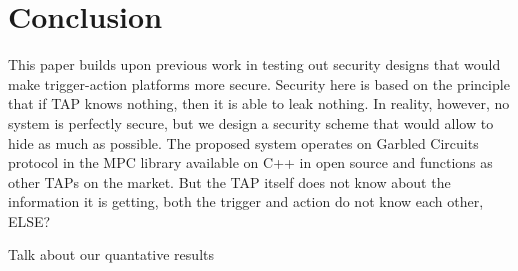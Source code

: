 \section{Conclusion}
\label{sec:conclusion}

This paper builds upon previous work in testing out security designs that would make trigger-action
platforms more secure. Security here is based on the principle that if TAP knows nothing, then it is able
to leak nothing. In reality, however, no system is perfectly secure, but we design a security scheme that
would allow to hide as much as possible. The proposed system operates on Garbled Circuits protocol
in the MPC library available on C++ in open source and functions as other TAPs on the market. But the
TAP itself does not know about the information it is getting, both the trigger and action do not know each
other, ELSE?

Talk about our quantative results